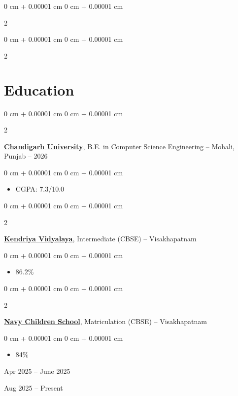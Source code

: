 \documentclass[10pt, letterpaper]{article}
\newenvironment{highlights}{
    \begin{itemize}[
        topsep=0.03 cm, %
        parsep=0.03 cm, %
        partopsep=0pt,
        itemsep=0pt,
        leftmargin=0 cm + 10pt
    ]
}{
    \end{itemize}
} %
\newenvironment{onecolentry}{
    \begin{adjustwidth}{
        0 cm + 0.00001 cm
    }{
        0 cm + 0.00001 cm
    }
}{
    \end{adjustwidth}
} %
\newenvironment{twocolentry}[2][]{
    \onecolentry
    \def\secondColumn{#2}
    \setcolumnwidth{\fill, 4.5 cm}
    \begin{paracol}{2}
}{
    \switchcolumn \raggedleft \secondColumn
    \end{paracol}
    \endonecolentry
} %
\begin{document}
\begin{twocolentry}{
            Aug 2025 – Present
        }
\begin{twocolentry}{
            Apr 2025 – June 2025
        }
    \section{Education}

        \begin{twocolentry}{
            2022 – 2026
        }
            \textbf{\href{https://www.cuchd.in/}{\textbf{Chandigarh University}}}, B.E. in Computer Science Engineering -- Mohali, Punjab\end{twocolentry}

        \vspace{0.05 cm}
        \begin{onecolentry}
            \begin{highlights}
                \item CGPA: 7.3/10.0
            \end{highlights}
        \end{onecolentry}

        \vspace{0.08 cm}

        \begin{twocolentry}{
            2020
        }
            \textbf{\href{https://kv1visakhapatnam.kvs.ac.in/}{\textbf{Kendriya Vidyalaya}}}, Intermediate (CBSE) -- Visakhapatnam\end{twocolentry}

        \vspace{0.05 cm}
        \begin{onecolentry}
            \begin{highlights}
                \item 86.2\%
            \end{highlights}
        \end{onecolentry}

        \vspace{0.08 cm}

        \begin{twocolentry}{
            2018
        }
            \textbf{\href{https://navalbase.kvs.ac.in/}{\textbf{Navy Children School}}}, Matriculation (CBSE) -- Visakhapatnam\end{twocolentry}

        \vspace{0.05 cm}
        \begin{onecolentry}
            \begin{highlights}
                \item 84\%
            \end{highlights}
        \end{onecolentry}


\end{twocolentry}
\end{twocolentry}
\end{document}
